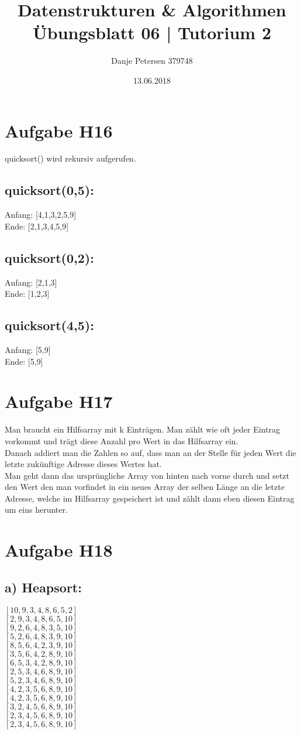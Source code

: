 \documentclass[a4paper,graphics,14pt]{article}
\author		{ \Large Danje Petersen 379748}
\title{ \Huge Datenstrukturen \& Algorithmen \\
		\huge Übungsblatt 06 | Tutorium 2}
\date{13.06.2018}
\newcommand{\aufgabe}[1]{\section*{Aufgabe #1}}
\newcommand{\apt}[1]{\subsection*{#1:} }
\begin{document}
\doublespacing
\maketitle
\onehalfspacing

\aufgabe{H16}

quicksort() wird rekursiv aufgerufen.

\apt{quicksort(0,5)}
Anfang: \hspace{1cm} [4,1,3,2,5,9] \\
Ende: \hspace{1,33cm} [2,1,3,4,5,9] \\

\apt{quicksort(0,2)}
Anfang: \hspace{1cm} [2,1,3] \\
Ende: \hspace{1,33cm} [1,2,3] \\

\apt{quicksort(4,5)}
Anfang: \hspace{1cm} [5,9] \\
Ende: \hspace{1,33cm} [5,9] \\


\aufgabe{H17}
Man braucht ein Hilfsarray mit k Einträgen. Man zählt wie oft jeder Eintrag vorkommt und trägt diese Anzahl pro Wert in das Hilfsarray ein. \\
Danach addiert man die Zahlen so auf, dass man an der Stelle für jeden Wert die letzte zukünftige Adresse dieses Wertes hat. \\
Man geht dann das ursprüngliche Array von hinten nach vorne durch und setzt den Wert den man vorfindet in ein neues Array der selben Länge an die letzte Adresse, welche im Hilfsarray gespeichert ist und zählt dann eben diesen Eintrag um eins herunter. \\


\aufgabe{H18}

\apt{a) Heapsort}

$[10,9,3,4,8,6,5,2]$ \\
$[2,9,3,4,8,6,5,10]$ \\
$[9,2,6,4,8,3,5,10]$ \\
$[5,2,6,4,8,3,9,10]$ \\
$[8,5,6,4,2,3,9,10]$ \\
$[3,5,6,4,2,8,9,10]$ \\
$[6,5,3,4,2,8,9,10]$ \\
$[2,5,3,4,6,8,9,10]$ \\
$[5,2,3,4,6,8,9,10]$ \\
$[4,2,3,5,6,8,9,10]$ \\
$[4,2,3,5,6,8,9,10]$ \\
$[3,2,4,5,6,8,9,10]$ \\
$[2,3,4,5,6,8,9,10]$ \\
$[2,3,4,5,6,8,9,10]$ \\
\end{document}
